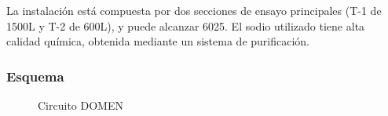 \documentclass{article}
\begin{document}
La instalación está compuesta por dos secciones de ensayo principales (T-1 de 1500L y T-2 de 600L), y puede alcanzar 6025\celsius. El sodio utilizado tiene alta calidad química, obtenida mediante un sistema de purificación.
\subsubsection*{Esquema}
\begin{figure}[H]
\begin{center}
\end{center}
\caption{Circuito DOMEN}
\end{figure}
\end{document}
